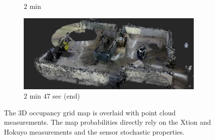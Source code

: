\documentclass[smallextended]{svjour3}       %
\begin{document}
\begin{figure}[!t]
\begin{subfigure}[t]{0.95\columnwidth}
        		\caption{$2$ min}
    	\end{subfigure}
    	\begin{subfigure}[t]{0.95\columnwidth}
	\vspace*{0.03\columnwidth}
           	\centering
          	\includegraphics[width=\textwidth]{experiment_ogm3D_2min47sec.jpg}
        		\caption{$2$ min $47$ sec (end)}
    	\end{subfigure}
	\caption{The 3D occupancy grid map is overlaid with point cloud measurements. The map probabilities directly rely on the Xtion and Hokuyo measurements and the sensor stochastic properties.}
	\label{fig:exp3DMap}
\end{figure}
\end{document}
